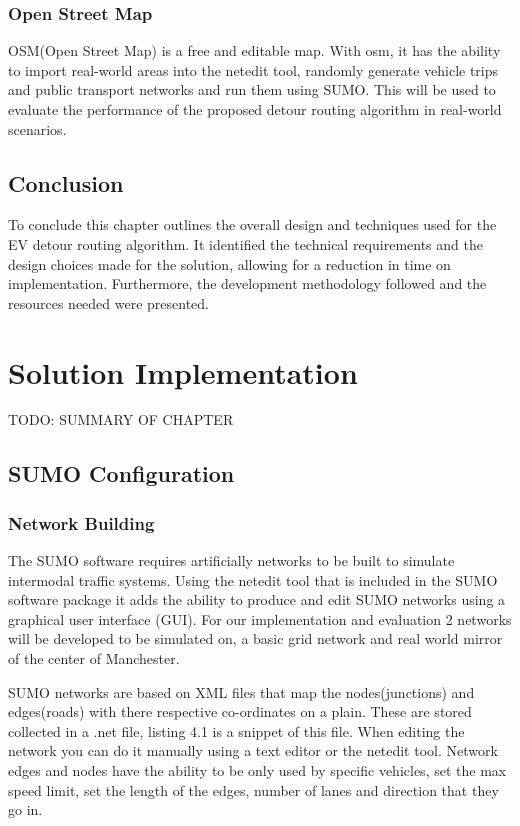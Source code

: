 \documentclass[11pt]{report}
\begin{document}
\subsection{Open Street Map}

OSM(Open Street Map) is a free and editable map. With osm, it has the ability to import real-world areas into the netedit tool, randomly generate vehicle trips and public transport networks and run them using SUMO. This will be used to evaluate the performance of the proposed detour routing algorithm in real-world scenarios.

\section{Conclusion}

To conclude this chapter outlines the overall design and techniques used for the EV detour routing algorithm. It identified the technical requirements and the design choices made for the solution, allowing for a reduction in time on implementation. Furthermore, the development methodology followed and the resources needed were presented.

\newpage

\chapter{Solution Implementation}

\newpage

TODO: SUMMARY OF CHAPTER

\section{SUMO Configuration}

\subsection{Network Building}

The SUMO software requires artificially networks to be built to simulate intermodal traffic systems. Using the netedit tool that is included in the SUMO software package it adds the ability to produce and edit SUMO networks using a graphical user interface (GUI). For our implementation and evaluation 2 networks will be developed to be simulated on, a basic grid network and real world mirror of the center of Manchester.

SUMO networks are based on XML files that map the nodes(junctions) and edges(roads) with there respective co-ordinates on a plain. These are stored collected in a .net file, listing 4.1 is a snippet of this file. When editing the network you can do it manually using a text editor or the netedit tool. Network edges and nodes have the ability to be only used by specific vehicles, set the max speed limit, set the length of the edges, number of lanes and direction that they go in. 
\end{document}
